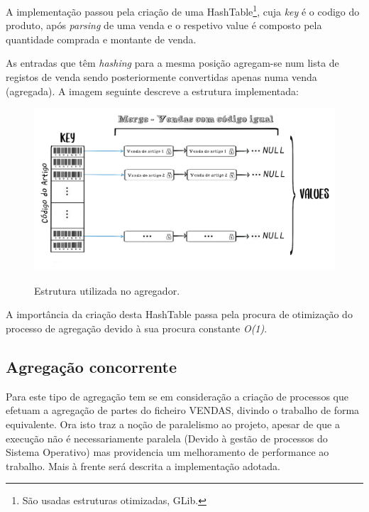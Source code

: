 \documentclass[a4paper,11pt]{report}
\begin{document}
A implementação passou pela criação de uma HashTable\footnote{São usadas estruturas otimizadas, GLib.}, cuja \textit{key} é o codigo do produto, após \textit{parsing} de uma venda e o respetivo value é composto pela quantidade comprada e montante de venda. \par

As entradas que têm \textit{hashing} para a mesma posição agregam-se num lista de registos de venda sendo posteriormente convertidas apenas numa venda (agregada). A imagem seguinte descreve a estrutura implementada:

\begin{figure}[H]
    \centering
    \includegraphics[scale=0.5]{htag.png}
    \label{img:htag}
    \caption{Estrutura utilizada no agregador.}
\end{figure}

A importância da criação desta HashTable passa pela procura de otimização do processo de agregação devido à sua procura constante \textit{O(1)}.

\subsection{Agregação concorrente}
\vspace{1.0cm}

\hspace{0.50cm} Para este tipo de agregação tem se em consideração a criação de processos que efetuam a agregação de partes do ficheiro VENDAS, divindo o trabalho de forma equivalente. Ora isto traz a noção de paralelismo ao projeto, apesar de que a execução não é necessariamente paralela (Devido à gestão de processos do Sistema Operativo) mas providencia um melhoramento de performance ao trabalho.
Mais à frente será descrita a implementação adotada.
\vspace{1.0cm}
\end{document}
